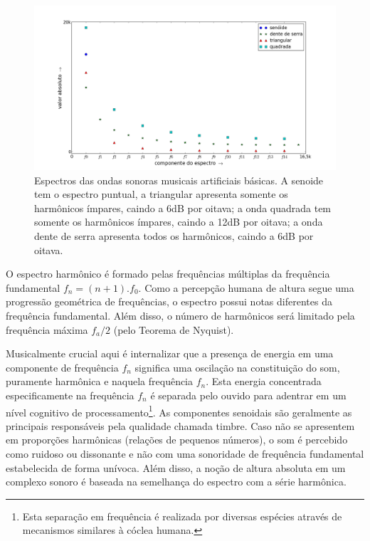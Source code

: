 \begin{figure}[h!]
    \centering
        \includegraphics[width=\textwidth]{figuras/espectroDeOndas6}
    \caption{Espectros das ondas sonoras musicais artificiais básicas. A senoide tem o espectro puntual, a triangular apresenta somente os harmônicos ímpares, caindo a 6dB por oitava; a onda quadrada tem somente os harmônicos ímpares, caindo a 12dB por oitava; a onda dente de serra apresenta todos os harmônicos, caindo a 6dB por oitava.}
        \label{fig:espectroDeOndas}
\end{figure}


O espectro harmônico é formado pelas frequências múltiplas da frequência fundamental $f_n=(n+1).f_0$.
Como a percepção humana de altura segue uma progressão geométrica de frequências, o espectro possui notas diferentes da frequência fundamental. Além disso, o número de harmônicos será limitado pela frequência máxima $f_a/2$ (pelo Teorema de Nyquist). 

Musicalmente crucial aqui é internalizar que a presença de
energia
em uma componente de frequência $f_n$ significa
 uma oscilação na constituição do som, puramente harmônica e naquela frequência $f_n$. Esta energia concentrada especificamente na frequência $f_n$ é separada
 pelo ouvido para adentrar em um nível cognitivo de processamento\footnote{Esta separação em frequência é realizada por diversas espécies através de mecanismos similares à cóclea humana.\cite{Roederer}}.
  As componentes senoidais são geralmente as principais responsáveis pela qualidade chamada timbre. Caso não se apresentem em proporções harmônicas (relações de pequenos números), o som é percebido como ruidoso ou dissonante e não com uma sonoridade de frequência fundamental estabelecida de forma unívoca. Além disso, a noção de altura absoluta em um complexo sonoro é baseada na semelhança do espectro com a série harmônica.\cite{Roederer}

